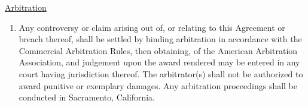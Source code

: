 \underline{Arbitration}
\begin{enumerate}
    \item Any controversy or claim arising out of, or relating to this
    Agreement or breach thereof, shall be settled by binding arbitration in
    accordance with the Commercial Arbitration Rules, then obtaining, of
    the American Arbitration Association, and judgement upon the award
    rendered may be entered in any court having jurisdiction thereof. The
    arbitrator(s) shall not be authorized to award punitive or exemplary
    damages. Any arbitration proceedings shall be conducted in Sacramento,
    California.
\end{enumerate}